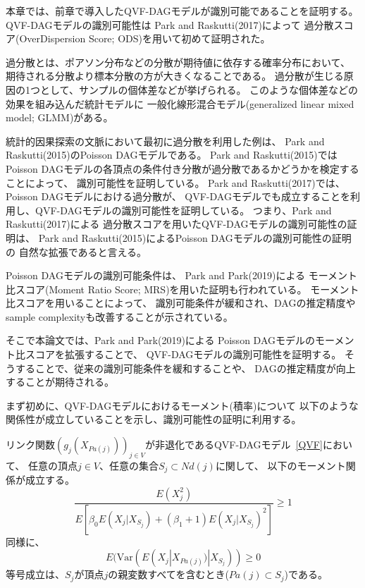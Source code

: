 

本章では、前章で導入したQVF-DAGモデル\cite{Park2017-hw}が識別可能であることを証明する。
QVF-DAGモデルの識別可能性は
Park and Raskutti(2017)\cite{Park2017-hw}によって
過分散スコア(OverDispersion Score; ODS)を用いて初めて証明された。

過分散とは、ポアソン分布などの分散が期待値に依存する確率分布において、
期待される分散より標本分散の方が大きくなることである。
過分散が生じる原因の1つとして、サンプルの個体差などが挙げられる。
このような個体差などの効果を組み込んだ統計モデルに
一般化線形混合モデル(generalized linear mixed model; GLMM)がある\cite{2012-iq}。

統計的因果探索の文脈において最初に過分散を利用した例は、
Park and Raskutti(2015)\cite{Park2015-tj}のPoisson DAGモデルである。
Park and Raskutti(2015)\cite{Park2015-tj}では
Poisson DAGモデルの各頂点の条件付き分散が過分散であるかどうかを検定することによって、
識別可能性を証明している。
Park and Raskutti(2017)\cite{Park2017-hw}では、
Poisson DAGモデルにおける過分散が、
QVF-DAGモデルでも成立することを利用し、QVF-DAGモデルの識別可能性を証明している。
つまり、Park and Raskutti(2017)\cite{Park2017-hw}による
過分散スコアを用いたQVF-DAGモデルの識別可能性の証明は、
Park and Raskutti(2015)\cite{Park2015-tj}によるPoisson DAGモデルの識別可能性の証明の
自然な拡張であると言える。

Poisson DAGモデルの識別可能条件は、
Park and Park(2019)\cite{Park2019-qy}による
モーメント比スコア(Moment Ratio Score; MRS)を用いた証明も行われている。
モーメント比スコアを用いることによって、
識別可能条件が緩和され、DAGの推定精度やsample complexityも改善することが示されている\cite{Park2019-qy}。

そこで本論文では、Park and Park(2019)\cite{Park2019-qy}による
Poisson DAGモデルのモーメント比スコアを拡張することで、
QVF-DAGモデルの識別可能性を証明する。
そうすることで、従来の識別可能条件\cite{Park2017-hw}を緩和することや、
DAGの推定精度が向上することが期待される。

まず初めに、QVF-DAGモデルにおけるモーメント(積率)について
以下のような関係性が成立していることを示し、識別可能性の証明に利用する。

\begin{prop} \label{prop:MRS}
  リンク関数$(g_j(X_{Pa(j)}))_{j \in V}$が非退化であるQVF-DAGモデル~\eqref{QVF}において、
  任意の頂点$j \in V$、任意の集合$S_j \subset \mathit{Nd}(j)$に関して、
  以下のモーメント関係が成立する。
  \begin{equation}
    \frac{E(X_j^2)}
    {E \left[ \beta_0 E(X_j | X_{S_j}) + (\beta_1 + 1)E(X_j | X_{S_j})^2 \right]}
    \geq 1
    \label{eq:MRS}
  \end{equation}
  同様に、
  \begin{equation}
    \label{eq:MRS_2}
    E(\mathrm{Var}( E(X_j | X_{Pa(j)}) | X_{S_j} )) \geq 0
  \end{equation}
  等号成立は、$S_j$が頂点$j$の親変数すべてを含むとき($Pa(j)\subset S_j$)である。
\end{prop}

